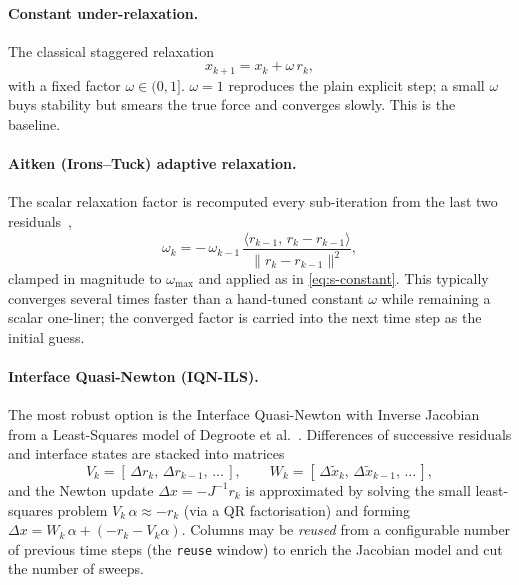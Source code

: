 \documentclass[10pt,onecolumn]{article}
\begin{document}
\paragraph{Constant under-relaxation.}
The classical staggered relaxation
\begin{equation}
  x_{k+1} = x_k + \omega\,r_k,
  \label{eq:s-constant}
\end{equation}
with a fixed factor $\omega\in(0,1]$.  $\omega=1$ reproduces the plain
explicit step; a small $\omega$ buys stability but smears the true
force and converges slowly.  This is the baseline.

\paragraph{Aitken (Irons--Tuck) adaptive relaxation.}
The scalar relaxation factor is recomputed every sub-iteration from the
last two residuals~\cite{irons1969version},
\begin{equation}
  \omega_k = -\,\omega_{k-1}\,
  \frac{\langle r_{k-1},\,r_k-r_{k-1}\rangle}
       {\lVert r_k-r_{k-1}\rVert^{2}},
  \label{eq:s-aitken}
\end{equation}
clamped in magnitude to $\omega_{\max}$ and applied as in
\eqref{eq:s-constant}.  This typically converges several times faster
than a hand-tuned constant $\omega$ while remaining a scalar one-liner;
the converged factor is carried into the next time step as the initial
guess.

\paragraph{Interface Quasi-Newton (IQN-ILS).}
The most robust option is the Interface Quasi-Newton with Inverse
Jacobian from a Least-Squares model of
Degroote et al.~\cite{degroote2009performance}.  Differences of
successive residuals and interface states are stacked into matrices
\begin{equation}
  V_k = [\,\Delta r_{k},\,\Delta r_{k-1},\,\dots\,],\qquad
  W_k = [\,\Delta \tilde x_{k},\,\Delta \tilde x_{k-1},\,\dots\,],
  \label{eq:s-iqn-cols}
\end{equation}
and the Newton update $\Delta x = -J^{-1}r_k$ is approximated by solving
the small least-squares problem $V_k\,\alpha \approx -r_k$ (via a QR
factorisation) and forming $\Delta x = W_k\,\alpha + (-r_k - V_k\alpha)$.
Columns may be \emph{reused} from a configurable number of previous time
steps (the \texttt{reuse} window) to enrich the Jacobian model and cut
the number of sweeps.
\end{document}

